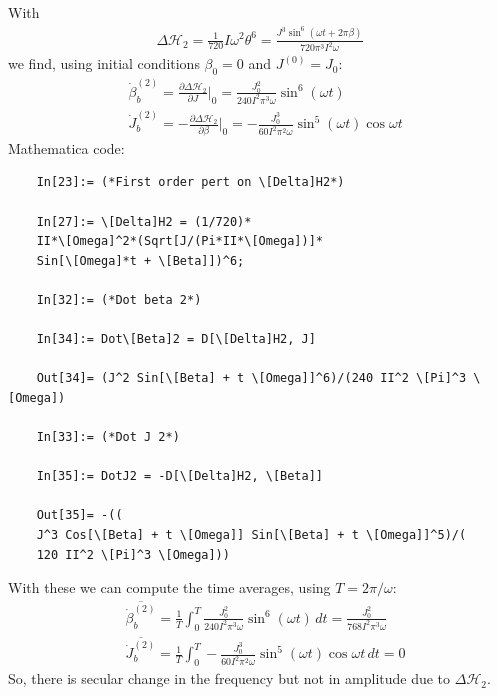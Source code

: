 \documentclass{article}
\theoremstyle{definition}
\newcommand{\p}{\partial}
\newcommand{\ham}{\mathcal{H}}
\newcommand{\be}{\beta}
\newcommand{\f}[2]{\frac{#1}{#2}}
\begin{document}
\begin{enumerate}[label=(\alph*)]
	With 
	\begin{align*}
	\Delta \ham_2 = \f{1}{720} I \omega^2 \theta^6 = \frac{J^3 \sin ^6(\omega t + 2\pi \be)}{720 \pi ^3 I^2 \omega }
	\end{align*}
	we find, using initial conditions $\be_0 = 0$ and $J^{(0)} = J_0$:
	\begin{align*}
	&\dot\be^{(2)}_b = \f{\p \Delta \ham_2}{\p J}\bigg\vert_0 = 
	\boxed{\f{J_0^2}{240 I^2 \pi^3 \omega} \sin^6 ( \omega t)}\\
	&\dot J^{(2)}_b  = -\f{\p \Delta \ham_2}{\p \be}\bigg\vert_0 = 
	\boxed{- \f{J_0^3 }{60 I^2 \pi^2 \omega} \sin^5( \omega t) \cos \omega t  }
	\end{align*}
	Mathematica code:
	\begin{lstlisting}
	In[23]:= (*First order pert on \[Delta]H2*)
	
	In[27]:= \[Delta]H2 = (1/720)*
	II*\[Omega]^2*(Sqrt[J/(Pi*II*\[Omega])]*
	Sin[\[Omega]*t + \[Beta]])^6;
	
	In[32]:= (*Dot beta 2*)
	
	In[34]:= Dot\[Beta]2 = D[\[Delta]H2, J]
	
	Out[34]= (J^2 Sin[\[Beta] + t \[Omega]]^6)/(240 II^2 \[Pi]^3 \[Omega])
	
	In[33]:= (*Dot J 2*)
	
	In[35]:= DotJ2 = -D[\[Delta]H2, \[Beta]]
	
	Out[35]= -((
	J^3 Cos[\[Beta] + t \[Omega]] Sin[\[Beta] + t \[Omega]]^5)/(
	120 II^2 \[Pi]^3 \[Omega]))
	\end{lstlisting}
	
	
	With these we can compute the time averages, using $T = 2\pi/\omega$:
	\begin{align*}
	&\overline{\dot \be^{(2)}_b} = \f{1}{T}\int^T_0 \f{J_0^2}{240 I^2 \pi^3 \omega} \sin^6 ( \omega t)\,dt = \boxed{\f{J_0^2}{768 I^2 \pi^3 \omega}} \\
	&\overline{\dot J^{(2)}_b} = \f{1}{T} \int^T_0 - \f{J_0^3 }{60 I^2 \pi^2 \omega} \sin^5( \omega t) \cos \omega t\,dt = \boxed{0}
	\end{align*}
	So, there is secular change in the frequency but not in amplitude due to $\Delta \ham_2$. 
	
	
	

\end{enumerate}
\end{document}
